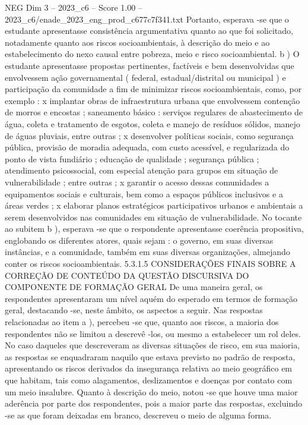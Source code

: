 \begin{textsample}{NEG Dim 3 – 2023\_c6 – Score 1.00 – 2023\_c6/enade\_2023\_eng\_prod\_c677c7f341.txt}
Portanto, esperava -se que o estudante apresentasse consistência argumentativa quanto ao que foi solicitado, notadamente quanto aos riscos socioambientais, à descrição do meio e ao estabelecimento do nexo causal entre pobreza, meio e risco socioambiental. b ) O estudante apresentasse propostas pertinentes, factíveis e bem desenvolvidas que envolvessem ação governamental ( federal, estadual/distrital ou municipal ) e participação da comunidade a fim de minimizar riscos socioambientais, como, por exemplo : x implantar obras de infraestrutura urbana que envolvessem contenção de morros e encostas ; saneamento básico : serviços regulares de abastecimento de água, coleta e tratamento de esgotos, coleta e manejo de resíduos sólidos, manejo de águas pluviais, entre outras ; x desenvolver políticas sociais, como segurança pública, provisão de moradia adequada, com custo acessível, e regularizada do ponto de vista fundiário ; educação de qualidade ; segurança pública ; atendimento psicossocial, com especial atenção para grupos em situação de vulnerabilidade ; entre outras ; x garantir o acesso dessas comunidades a equipamentos sociais e culturais, bem como a espaços públicos inclusivos e a áreas verdes ; x elaborar planos estratégicos participativos urbanos e ambientais a serem desenvolvidos nas comunidades em situação de vulnerabilidade.
No tocante ao subitem b ), esperava -se que o respondente apresentasse coerência propositiva, englobando os diferentes atores, quais sejam : o governo, em suas diversas instâncias, e a comunidade, também em suas diversas organizações, almejando conter os riscos socioambientais. 5.3.1.5 CONSIDERAÇÕES FINAIS SOBRE A CORREÇÃO DE CONTEÚDO DA QUESTÃO DISCURSIVA DO COMPONENTE DE FORMAÇÃO GERAL De uma maneira geral, os respondentes apresentaram um nível aquém do esperado em termos de formação geral, destacando -se, neste âmbito, os aspectos a seguir.
Nas respostas relacionadas ao item a ), percebeu -se que, quanto aos riscos, a maioria dos respondentes não se limitou a descrevê -los, ou mesmo a estabelecer um rol deles.
No caso daqueles que descreveram as diversas situações de risco, em sua maioria, as respostas se enquadraram naquilo que estava previsto no padrão de resposta, apresentando os riscos derivados da insegurança relativa ao meio geográfico em que habitam, tais como alagamentos, deslizamentos e doenças por contato com um meio insalubre.
Quanto à descrição do meio, notou -se que houve uma maior aderência por parte dos respondentes, pois a maior parte das respostas, excluindo -se as que foram deixadas em branco, descreveu o meio de alguma forma.

\end{textsample}
